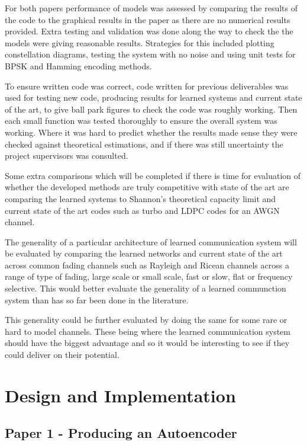 \documentclass[12pt,onecolumn,letterpaper]{article}
\begin{document}
For both papers performance of models was assessed by comparing the results of the code to the graphical results in the paper as there are no numerical results provided. Extra testing and validation was done along the way to check the the models were giving reasonable results. Strategies for this included plotting constellation diagrams, testing the system with no noise and using unit tests for BPSK and Hamming encoding methods.

To ensure written code was correct, code written for previous deliverables was used for testing new code, producing results for learned systems and current state of the art, to give ball park figures to check the code was roughly working. Then each small function was tested thoroughly to ensure the overall system was working. Where it was hard to predict whether the results made sense they were checked against theoretical estimations, and if there was still uncertainty the project supervisors was consulted. 

Some extra comparisons which will be completed if there is time for evaluation of whether the developed methods are truly competitive with state of the art are comparing the learned systems to Shannon's theoretical capacity limit and current state of the art codes such as turbo and LDPC codes for an AWGN channel.

The generality of a particular architecture of learned communication system will be evaluated by comparing the learned networks and current state of the art across common fading channels such as Rayleigh and Ricean channels across a range of type of fading, large scale or small scale, fast or slow, flat or frequency selective. This would better evaluate the generality of a learned communction system than has so far been done in the literature.

This generality could be further evaluated by doing the same for some rare or hard to model channels. These being where the learned communication system should have the biggest advantage and so it would be interesting to see if they could deliver on their potential.


\FloatBarrier
\section{Design and Implementation}

\subsection{Paper 1 - Producing an Autoencoder}
\end{document}
